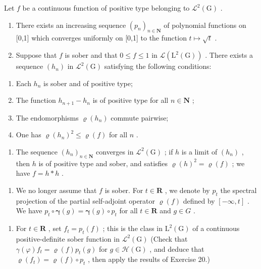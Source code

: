 Let \(f\) be a continuous function of positive type belonging to \(\mathcal{L}^2 (\mathrm{G})\) .

\begin{enumerate}
\def\labelenumi{\alph{enumi})}
\item
  There exists an increasing sequence \((p_{n})_{n\in\mathbf{N}}\) of polynomial functions on [0,1] which converges uniformly on [0,1] to the function \(t\mapsto\sqrt{t}\) .
\item
  Suppose that \(f\) is sober and that \(0 \leqslant f \leqslant 1\) in \(\mathcal{L}(\mathrm{L}^2(\mathrm{G}))\) . There exists a sequence \((h_n)\) in \(\mathcal{L}^2(\mathrm{G})\) satisfying the following conditions:
\end{enumerate}

\begin{enumerate}
\def\labelenumi{(\roman{enumi})}
\item
  Each \(h_n\) is sober and of positive type;
\item
  The function \(h_{n+1} - h_n\) is of positive type for all \(n \in \mathbf{N}\) ;
\item
  The endomorphisms \(\varrho(h_n)\) commute pairwise;
\item
  One has \(\varrho(h_n)^2 \leqslant \varrho(f)\) for all \(n\) .
\end{enumerate}

\begin{enumerate}
\def\labelenumi{\alph{enumi})}
\setcounter{enumi}{2}
\tightlist
\item
  The sequence \((h_n)_{n\in \mathbf{N}}\) converges in \(\mathcal{L}^2 (\mathrm{G})\) ; if \(h\) is a limit of \((h_n)\) , then \(h\) is of positive type and sober, and satisfies \(\varrho (h)^2 = \varrho (f)\) ; we have \(f = h*h\) .
\end{enumerate}

\begin{enumerate}
\def\labelenumi{\alph{enumi})}
\setcounter{enumi}{3}
\tightlist
\item
  We no longer assume that \(f\) is sober. For \(t \in \mathbf{R}\) , we denote by \(p_t\) the spectral projection of the partial self-adjoint operator \(\varrho(f)\) defined by \([- \infty, t]\) . We have \(p_t \circ \boldsymbol{\gamma}(g) = \boldsymbol{\gamma}(g) \circ p_t\) for all \(t \in \mathbf{R}\) and \(g \in G\) .
\end{enumerate}

\begin{enumerate}
\def\labelenumi{\alph{enumi})}
\setcounter{enumi}{4}
\tightlist
\item
  For \(t \in \mathbf{R}\) , set \(f_t = p_t(f)\) ; this is the class in \(\mathrm{L}^2(\mathrm{G})\) of a continuous positive-definite sober function in \(\mathcal{L}^2(\mathrm{G})\) (Check that \(\gamma(\varphi)f_t = \varrho(f)p_t(g)\) for \(g \in \mathcal{H}(\mathrm{G})\) , and deduce that \(\varrho(f_t) = \varrho(f) \circ p_t\) , then apply the results of Exercise 20.)
\end{enumerate}

